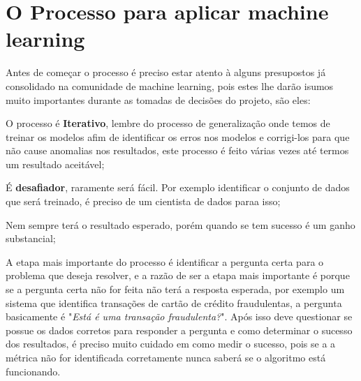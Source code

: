\section{O Processo para aplicar machine learning}
\label{sec:howtoapplyml}

Antes de começar o processo é preciso estar atento à alguns presupostos já consolidado na comunidade de machine learning, pois estes lhe darão isumos muito importantes durante 
as tomadas de decisões do projeto, são eles: 
\begin{alineas}
    \item O processo é \textbf{Iterativo}, lembre do processo de generalização onde temos de treinar os modelos afim de identificar os erros nos modelos e corrigi-los para que não cause
    anomalias nos resultados, este processo é feito várias vezes até termos um resultado aceitável;
    \item É  \textbf{desafiador}, raramente será fácil. Por exemplo identificar o conjunto de dados que será treinado, é preciso de um cientista de dados paraa isso; 
    \item Nem sempre terá o resultado esperado, porém quando se tem sucesso é um ganho substancial;
\end{alineas}
  
A etapa mais importante do processo é identificar a pergunta certa para o problema que deseja resolver, e a razão de ser a etapa mais importante é 
porque se a pergunta certa não for feita não terá a resposta esperada, por exemplo um sistema que identifica transações de cartão de crédito fraudulentas, a 
pergunta basicamente é "\textit{Está é uma transação fraudulenta?}". Após isso deve questionar se possue os dados corretos para responder a pergunta e como determinar o sucesso dos resultados,
é preciso muito cuidado em como medir o sucesso, pois se a a métrica não for identificada corretamente nunca saberá se o algoritmo está funcionando.


